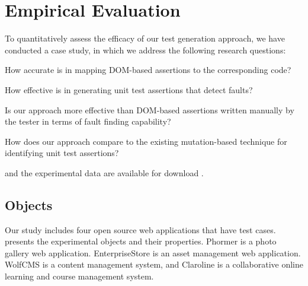 \section{Empirical Evaluation} \label{Sec:evaluation}
To quantitatively assess the efficacy of our test generation approach, we have conducted a case study, in which we address the following research questions:

\begin{description}[noitemsep]
\item [RQ1] How accurate is \tool in mapping DOM-based assertions to the corresponding \javascript code?
\item [RQ2] How effective is \tool in generating unit test assertions that detect faults?
\item [RQ3] Is our approach more effective than DOM-based assertions written manually by the tester in terms of fault finding capability? 
\item [RQ4] How does our approach compare to the existing mutation-based technique for identifying unit test assertions?
\end{description}

\tool and the experimental data are available for download \cite{atrina-dl}.
\subsection{Objects}
Our study includes four open source \javascript web applications that have \selenium test cases.
 presents the experimental objects and their properties. Phormer \cite{phormer} is a photo gallery web application. EnterpriseStore \cite{enterpriseStore} is an asset management web application. WolfCMS \cite{wolfcms} is a content management system, and Claroline \cite{claroline} is a collaborative online learning and course management system. 

